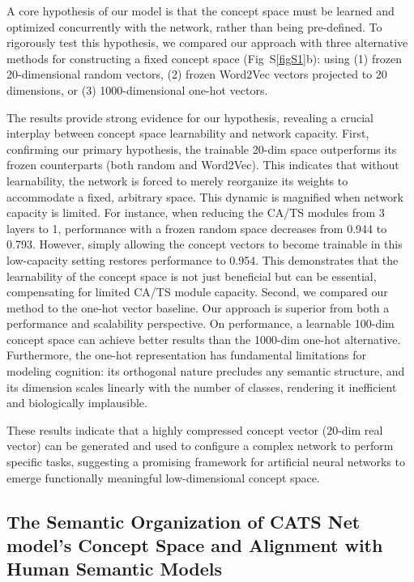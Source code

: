 \documentclass[pdflatex,sn-mathphys-num,lineno]{sn-jnl}%
\begin{document}
\begin{CJK}{UTF8}{gbsn}
A core hypothesis of our model is that the concept space must be learned and optimized concurrently with the network, rather than being pre-defined. To rigorously test this hypothesis, we compared our approach with three alternative methods for constructing a fixed concept space (Fig~S\ref{figS1}b): using (1) frozen 20-dimensional random vectors, (2) frozen Word2Vec vectors projected to 20 dimensions, or (3) 1000-dimensional one-hot vectors.

The results provide strong evidence for our hypothesis, revealing a crucial interplay between concept space learnability and network capacity. First, confirming our primary hypothesis, the trainable 20-dim space outperforms its frozen counterparts (both random and Word2Vec). This indicates that without learnability, the network is forced to merely reorganize its weights to accommodate a fixed, arbitrary space. This dynamic is magnified when network capacity is limited. For instance, when reducing the CA/TS modules from 3 layers to 1, performance with a frozen random space decreases from 0.944 to 0.793. However, simply allowing the concept vectors to become trainable in this low-capacity setting restores performance to 0.954. This demonstrates that the learnability of the concept space is not just beneficial but can be essential, compensating for limited CA/TS module capacity. Second, we compared our method to the one-hot vector baseline. Our approach is superior from both a performance and scalability perspective. On performance, a learnable 100-dim concept space can achieve better results than the 1000-dim one-hot alternative. Furthermore, the one-hot representation has fundamental limitations for modeling cognition: its orthogonal nature precludes any semantic structure, and its dimension scales linearly with the number of classes, rendering it inefficient and biologically implausible.

These results indicate that a highly compressed concept vector (20-dim real vector) can be generated and used to configure a complex network to perform specific tasks, suggesting a promising framework for artificial neural networks to emerge functionally meaningful low-dimensional concept space. 

\subsection{The Semantic Organization of CATS Net model’s Concept Space and Alignment with Human Semantic Models}\label{subsec_space_prop} 


\end{CJK}
\end{document}

